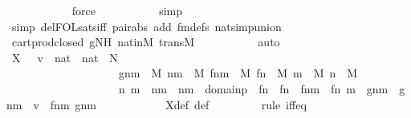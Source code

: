 \begin{isabellebody}
\ \ \ \ \ \ \ \ \ \ \isamarkupfalse%
\ force\ \isanewline
\ \ \ \ \ \ \ \ \isamarkupfalse%
\ simp\isanewline
\ \ \ \ \ \ \ \ \ \isamarkupfalse%
\ {\isacharparenleft}{\kern0pt}simp\ del{\isacharcolon}{\kern0pt}FOL{\isacharunderscore}{\kern0pt}sats{\isacharunderscore}{\kern0pt}iff\ pair{\isacharunderscore}{\kern0pt}abs\ add{\isacharcolon}{\kern0pt}\ fm{\isacharunderscore}{\kern0pt}defs\ nat{\isacharunderscore}{\kern0pt}simp{\isacharunderscore}{\kern0pt}union{\isacharparenright}{\kern0pt}\isanewline
\ \ \ \ \ \ \ \ \isamarkupfalse%
\ cartprod{\isacharunderscore}{\kern0pt}closed\ gNH\ nat{\isacharunderscore}{\kern0pt}in{\isacharunderscore}{\kern0pt}M\ transM\ \isanewline
\ \ \ \ \ \ \ \ \isamarkupfalse%
\ auto\isanewline
\isanewline
\ \ \ \ \ \ \isamarkupfalse%
\ {\isachardoublequoteopen}X\ {\isacharequal}{\kern0pt}\ {\isacharbraceleft}{\kern0pt}\ v\ {\isasymin}\ {\isacharparenleft}{\kern0pt}nat\ {\isasymtimes}\ nat{\isacharparenright}{\kern0pt}\ {\isasymtimes}\ N{\isachardot}{\kern0pt}\ \isanewline
\ \ \ \ \ \ \ \ \ \ \ \ \ \ \ \ \ \ \ \ {\isasymexists}gnm\ {\isasymin}\ M{\isachardot}{\kern0pt}\ {\isasymexists}nm\ {\isasymin}\ M{\isachardot}{\kern0pt}\ {\isasymexists}fnm\ {\isasymin}\ M{\isachardot}{\kern0pt}\ {\isasymexists}fn\ {\isasymin}\ M{\isachardot}{\kern0pt}\ {\isasymexists}m\ {\isasymin}\ M{\isachardot}{\kern0pt}\ {\isasymexists}n\ {\isasymin}\ M{\isachardot}{\kern0pt}\ \isanewline
\ \ \ \ \ \ \ \ \ \ \ \ \ \ \ \ \ \ \ \ {\isacharless}{\kern0pt}n{\isacharcomma}{\kern0pt}\ m{\isachargreater}{\kern0pt}\ {\isacharequal}{\kern0pt}\ nm\ {\isasymand}\ nm\ {\isasymin}\ domain{\isacharparenleft}{\kern0pt}p{\isacharparenright}{\kern0pt}\ {\isasymand}\ f{\isacharbackquote}{\kern0pt}n\ {\isacharequal}{\kern0pt}\ fn\ {\isasymand}\ fnm\ {\isacharequal}{\kern0pt}\ {\isacharless}{\kern0pt}fn{\isacharcomma}{\kern0pt}\ m{\isachargreater}{\kern0pt}\ {\isasymand}\ gnm\ {\isacharequal}{\kern0pt}\ g{\isacharbackquote}{\kern0pt}nm\ {\isasymand}\ v\ {\isacharequal}{\kern0pt}\ {\isacharless}{\kern0pt}fnm{\isacharcomma}{\kern0pt}\ gnm{\isachargreater}{\kern0pt}\ {\isacharbraceright}{\kern0pt}{\isachardoublequoteclose}\ \isanewline
\isanewline
\ \ \ \ \ \ \ \ \isamarkupfalse%
\ X{\isacharunderscore}{\kern0pt}def\ {\isasymphi}{\isacharunderscore}{\kern0pt}def\isanewline
\ \ \ \ \ \ \ \ \isamarkupfalse%
{\isacharparenleft}{\kern0pt}rule\ iff{\isacharunderscore}{\kern0pt}eq{\isacharparenright}{\kern0pt}\isanewline
\ \ \ \ \ \ \ \ \isamarkupfalse%

\end{isabellebody}
